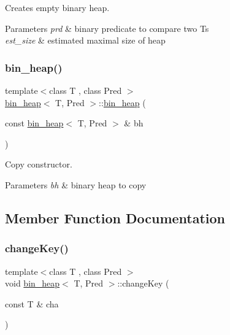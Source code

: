 Creates empty binary heap. 


\begin{DoxyParams}{Parameters}
{\em prd} & binary predicate to compare two {\ttfamily Ts} \\
\hline
{\em est\+\_\+size} & estimated maximal size of heap \\
\hline
\end{DoxyParams}
\mbox{\label{classbin__heap_a19bd4241e097852ffda83b72557ffbdc}} 
\subsubsection{\texorpdfstring{bin\+\_\+heap()}{bin\_heap()}\hspace{0.1cm}{\footnotesize\ttfamily [3/3]}}
{\footnotesize\ttfamily template$<$class T , class Pred $>$ \\
\mbox{\hyperlink{classbin__heap}{bin\+\_\+heap}}$<$ T, Pred $>$\+::\mbox{\hyperlink{classbin__heap}{bin\+\_\+heap}} (\begin{DoxyParamCaption}\item[{const \mbox{\hyperlink{classbin__heap}{bin\+\_\+heap}}$<$ T, Pred $>$ \&}]{bh }\end{DoxyParamCaption})}



Copy constructor. 


\begin{DoxyParams}{Parameters}
{\em bh} & binary heap to copy \\
\hline
\end{DoxyParams}


\subsection{Member Function Documentation}
\mbox{\label{classbin__heap_ab1353fe40c5cfc1205314a4db6334f1b}} 
\subsubsection{\texorpdfstring{change\+Key()}{changeKey()}}
{\footnotesize\ttfamily template$<$class T , class Pred $>$ \\
void \mbox{\hyperlink{classbin__heap}{bin\+\_\+heap}}$<$ T, Pred $>$\+::change\+Key (\begin{DoxyParamCaption}\item[{const T \&}]{cha }\end{DoxyParamCaption})}



